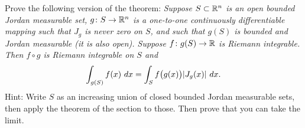 \begin{exercise}
Prove the following version of the theorem:
\emph{Suppose $S \subset {\mathbb{R}}^n$ is an open bounded Jordan measurable set,
$g \colon S \to {\mathbb{R}}^n$ is a one-to-one
continuously differentiable mapping such that
$J_g$ is never zero on $S$, and such that $g(S)$ is bounded and
Jordan measurable (it is also open).
Suppose $f \colon g(S) \to {\mathbb{R}}$ is Riemann
integrable.  Then $f \circ g$ is Riemann integrable on $S$ and}
\begin{equation*}
\int_{g(S)} f(x) ~ dx = 
\int_S f\bigl(g(x)\bigr) \lvert {J_g(x)} \rvert ~ dx .
\end{equation*}
Hint: Write $S$ as an increasing union of closed bounded Jordan measurable
sets, then apply the theorem of the section to those.  Then prove that you
can take the limit.
\end{exercise}
